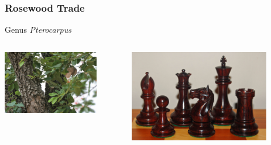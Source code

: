 \documentclass[10pt]{beamer}
\begin{document}
\begin{frame}[t]
\frametitle{Rosewood Trade}
\vspace{0.5cm}

	Genus \emph{Pterocarpus}\\
	
	\vspace{0.5cm}
	
	\begin{columns}
		\begin{column}{0.5\textwidth}
			\begin{center}
				\includegraphics[width=0.8\textwidth]{figures/pterocarpus.jpg}
			\end{center}
		\end{column}
		
		\begin{column}{0.5\textwidth}
			\begin{center}
				\includegraphics[width=0.8\textwidth]{figures/pterocarpus2.jpg}
			\end{center}
		\end{column}
	\end{columns}
\end{frame}
\end{document}
